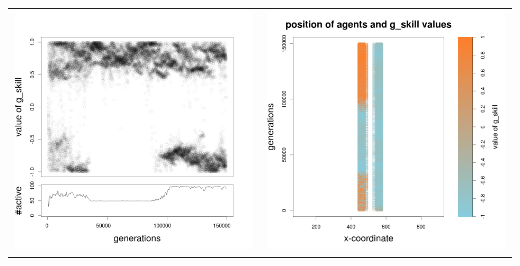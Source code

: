 \documentclass[a4paper,10pt]{article}
\begin{document}
\begin{table}[h!]
\begin{tabular}{cc}
 \newline
 \includegraphics[width=\imgSize]{images/5StaticEnv/Gplot99_staticEnv3}&\includegraphics[width=\imgSize]{images/5StaticEnv/Gplot99Static_staticEnv3}\\
 \end{tabular}

\end{table}
\end{document}
